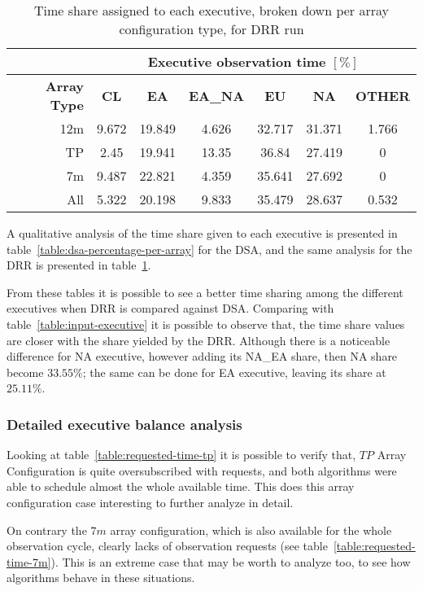\begin{table}[t]
\centering
\begin{tabular}{c|c|c|c|c|c|c|} 
\cline{2-7}
 & \multicolumn{6}{c|}{\textbf{Executive observation time $[\%]$}} \\ \hline
\multicolumn{1}{|r|}{\textbf{Array Type}} & \textbf{CL}	& \textbf{EA} & \textbf{EA\_NA} & \textbf{EU} & \textbf{NA} & \textbf{OTHER} \\ \hline
\multicolumn{1}{|r|}{12m} & 9.672 & 19.849 & 4.626 & 32.717 & 31.371 & 1.766 \\ \hline
\multicolumn{1}{|r|}{TP} & 2.45 & 19.941 & 13.35 & 36.84 & 27.419 & 0 \\ \hline
\multicolumn{1}{|r|}{7m} & 9.487 & 22.821 & 4.359 & 35.641 & 27.692 & 0 \\ \hline
\multicolumn{1}{|r|}{All} & 5.322 & 20.198 & 9.833 & 35.479 & 28.637 & 0.532 \\ \hline
\end{tabular}
\caption{Time share assigned to each executive, broken down per array configuration type, for DRR run}
\label{table:drr-percentage-per-array}
\end{table}

A qualitative analysis of the time share given to each executive is presented in table~\ref{table:dsa-percentage-per-array} for the DSA, and the same analysis for the DRR is presented in table~\ref{table:drr-percentage-per-array}. 

From these tables it is possible to see a better time sharing among the different executives when DRR is compared against DSA. Comparing with table~\ref{table:input-executive} it is possible to observe that, the time share values are closer with the share yielded by the DRR. Although there is a noticeable difference for NA executive, however adding its NA\_EA share, then NA share become $33.55\%$; the same can be done for EA executive, leaving its share at $25.11\%$.

\subsubsection{Detailed executive balance analysis}
Looking at table~\ref{table:requested-time-tp} it is possible to verify that, $TP$ Array Configuration is quite oversubscribed with requests, and both algorithms were able to schedule almost the whole available time. This does this array configuration case interesting to further analyze in detail. 

On contrary the $7m$ array configuration, which is also available for the whole observation cycle, clearly lacks of observation requests (see table~\ref{table:requested-time-7m}). This is an extreme case that may be worth to analyze too, to see how algorithms behave in these situations.

